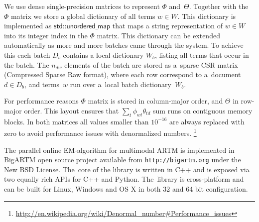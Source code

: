 \documentclass{sig-alternate-2013}
\newcommand{\kw}[1]{\textsf{#1}}
\begin{document}
We use dense single-precision matrices to represent $\Phi$ and~$\Theta$.
Together with the $\Phi$ matrix we store a global dictionary of all terms ${w \in W}$.
This dictionary is implemented as $\kw{std::unordered\_map}$ that maps a string representation of ${w \in W}$
into its integer index in the $\Phi$ matrix.
This dictionary can be extended automatically as more and more batches came through the system.
To achieve this each batch $D_b$ contains a local dictionary $W_b$, listing all terms that occur in the batch.
The $n_{dw}$ elements of the batch are stored as a~sparse CSR matrix (Compressed Sparse Raw format),
where each row correspond to a~document ${d \in D_b}$,
and terms~$w$ run over a~local batch dictionary~$W_b$.

For performance reasons $\Phi$ matrix is stored in column-major order, and $\Theta$ in row-major order.
This layout ensures that $\sum_t \phi_{wt} \theta_{td}$ sum runs on contiguous memory blocks.
In both matrices all values smaller than $10^{-16}$ are always replaced with zero to avoid performance issues with denormalized numbers.%
\footnote{\url{http://en.wikipedia.org/wiki/Denormal_number#Performance_issues}}

The parallel online EM-algorithm for multimodal ARTM is implemented in
BigARTM open source project available from \texttt{http://bigartm.org}
under the New BSD License.
The~core of the library is written in C++ and is exposed via two equally rich APIs for C++ and Python.
The~library is cross-platform and can be built for Linux, Windows and OS X in both 32 and 64 bit configuration.
\end{document}
